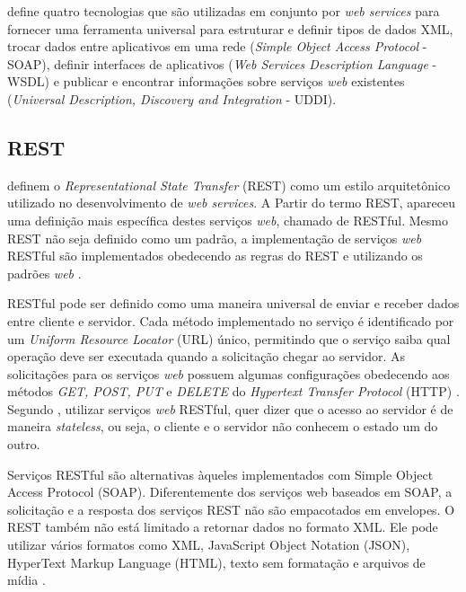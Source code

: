 \documentclass[
	12pt,				%
	openright,			%
	oneside,			%
	a4paper,			%
	chapter=TITLE,		%
	section=TITLE,		%
	english,			%
	french,				%
	spanish,			%
	brazil				%
	]{abntex2}
\begin{document}
 define quatro tecnologias que são utilizadas em conjunto por \textit{web services} para fornecer uma ferramenta universal para estruturar e definir tipos de dados XML, trocar dados entre aplicativos em uma rede (\textit{Simple Object Access Protocol} - SOAP), definir interfaces de aplicativos (\textit{Web Services Description Language} - WSDL) e publicar e encontrar informações sobre serviços \textit{web} existentes (\textit{Universal Description, Discovery and Integration} - UDDI).


\subsection{REST}


 definem o \textit{Representational State Transfer} (REST) como um estilo arquitetônico utilizado no desenvolvimento de \textit{web services}. A Partir do termo REST, apareceu uma definição mais específica destes serviços \textit{web}, chamado de RESTful. Mesmo REST não seja definido como um padrão, a implementação de serviços \textit{web} RESTful são implementados obedecendo as regras do REST e utilizando os padrões \textit{web} \cite{restPhpJquery}.

RESTful pode ser definido como uma maneira universal de enviar e receber dados entre cliente e servidor. Cada método implementado no serviço é identificado por um \textit{Uniform Resource Locator} (URL) único, permitindo que o serviço saiba qual operação deve ser executada quando a solicitação chegar ao servidor. As solicitações para os serviços \textit{web} possuem algumas configurações obedecendo aos métodos \textit{GET, POST, PUT} e \textit{DELETE} do \textit{Hypertext Transfer Protocol} (HTTP) \cite{deitel8ed}. Segundo , utilizar serviços \textit{web} RESTful, quer dizer que o acesso ao servidor é de maneira \textit{stateless}, ou seja, o cliente e o servidor não conhecem o estado um do outro.

\begin{citacao}
Serviços RESTful são alternativas àqueles implementados com Simple Object Access Protocol (SOAP). Diferentemente dos serviços web baseados em SOAP, a solicitação e a resposta dos serviços REST não são empacotados em envelopes. O REST também não está limitado a retornar dados no formato XML. Ele pode utilizar vários formatos como XML, JavaScript Object Notation (JSON),  HyperText Markup Language (HTML), texto sem formatação e arquivos de mídia \cite[p. 1020]{deitel8ed}.
\end{citacao}
\end{document}
